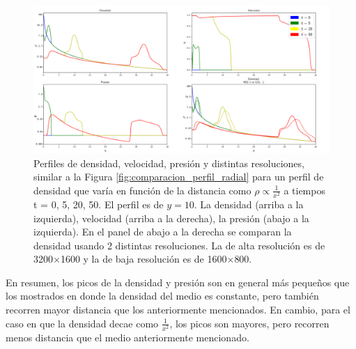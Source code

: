 \documentclass[12pt,a4paper]{book}
\begin{document}
\begin{figure}
  \centering
  \includegraphics[width = 1.0\textwidth]{./Figuras/capitulo_4/perfiles/perfiles_cuadraticos.png}
  \caption{Perfiles de densidad, velocidad, presión y distintas resoluciones, similar a la Figura 
  \ref{fig:comparacion_perfil_radial} para un perfil de densidad que varía en función de la distancia como
  $\rho \varpropto \frac{1}{x^2}$ a tiempos t = 0, 5, 20, 50.
  El perfil es de $y = 10$.
  La densidad (arriba a la izquierda), velocidad (arriba a la derecha), la presión (abajo a la izquierda). 
  En el panel de abajo a la derecha se comparan la densidad usando 2 distintas resoluciones. La de alta resolución
  es de 3200$\times$1600 y la de baja resolución es de 1600$\times$800.}\label{fig:Decaimiento_cuadratico_densidad_jet}
\end{figure}

En resumen, los picos de la densidad y presión 
son en general más pequeños que los mostrados en donde la densidad del medio es constante, pero también recorren mayor 
distancia que los anteriormente mencionados. En cambio, para el caso en que la densidad decae como $\frac{1}{x^2}$, los picos son mayores, pero recorren menos distancia que el medio anteriormente mencionado.
\end{document}
